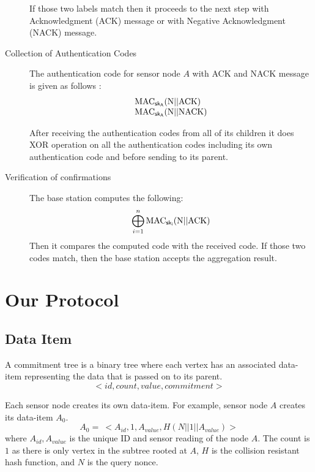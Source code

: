 \documentclass[%
  slidesonly,%
  semlayer%
  ]{seminar}                                  %
\newcommand{\sk}{\sf{sk}}
\begin{document}
\begin{slide}
\begin{description}
        If those two labels match then it proceeds to the next step with Acknowledgment (ACK) message or with Negative Acknowledgment (NACK) message.

      \item[Collection of Authentication Codes] 
      
        The authentication code for sensor node $A$ with ACK and NACK message is given as follows :
        \begin{equation*}
          \begin{array}{l}
            \mbox{MAC}_{\sk_{A}}( \mbox{N} || \mbox{ACK})\\
            \mbox{MAC}_{\sk_{A}}( \mbox{N} || \mbox{NACK})  
          \end{array}
        \end{equation*}

        After receiving the authentication codes from all of its children it does XOR operation on all the authentication codes including its own authentication code and before sending to its parent.

      \item[Verification of confirmations]
        The base station computes the following:
        \begin{equation*}
          \bigoplus_{i = 1}^n \mbox{MAC}_{\sk_{i}}(\mbox{N} || \mbox{ACK})
        \end{equation*}
        Then it compares the computed code with the received code. 
        If those two codes match, then the base station accepts the aggregation result.

      \end{description}
      \vfill
      \clearpage

\section*{Our Protocol}
    
    \subsection*{Data Item}
      \vfill
      A commitment tree is a binary tree where each vertex has an associated data-item representing the data that is passed on to its parent.
      \begin{equation*}
        < id, count, value, commitment >
      \end{equation*}

      Each sensor node creates its own data-item. 
      For example, sensor node $A$ creates its data-item $A_{0}$.
      \begin{equation*}
        A_{0} =\ <A_{id}, 1, A_{value}, H(N||1||A_{value})>
      \end{equation*}
      where $A_{id}, A_{value}$ is the unique ID and sensor reading of the node $A$. 
      The count is $1$ as there is only vertex in the subtree rooted at $A$, $H$ is the collision resistant hash function, and $N$ is the query nonce.
      \vfill
      \clearpage


\end{slide}
\end{document}
